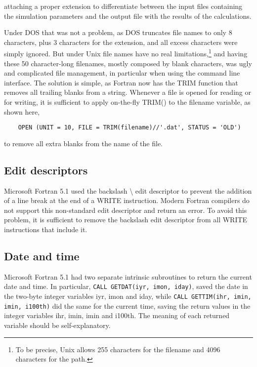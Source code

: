 attaching a proper extension to differentiate between the input files containing the simulation parameters and the output file with the results of the calculations.

Under DOS that was not a problem, as DOS truncates file names to only 8 characters, plus 3 characters for the extension, and all excess characters were simply ignored. But under Unix file names have no real limitations,\footnote{To be precise, Unix allows 255 characters for the filename and 4096 characters for the path.} and having these 50 character-long filenames, mostly composed by blank characters, was ugly and complicated file management, in particular when using the command line interface.
The solution is simple, as Fortran now has the \textsf{TRIM} function that removes all trailing blanks from a string. Whenever a file is opened for reading or for writing, it is sufficient to apply on-the-fly \textsf{TRIM()} to the \textsf{filename} variable, as shown here,

\begin{lstlisting}
	OPEN (UNIT = 10, FILE = TRIM(filename)//'.dat', STATUS = 'OLD')
\end{lstlisting}

to remove all extra blanks from the name of the file.



\subsection{Edit descriptors}

Microsoft Fortran 5.1 used the backslash \textbackslash{} edit descriptor to prevent the addition of a line break at the end of a \textsf{WRITE} instruction.
Modern Fortran compilers do not support this non-standard edit descriptor and return an error. To avoid this problem, it is sufficient to remove the backslash edit descriptor from all \textsf{WRITE} instructions that include it.


\subsection{Date and time}

Microsoft Fortran 5.1 had two separate intrinsic subroutines to return the current date and time.
In particular, \lstinline[columns=fixed]{CALL GETDAT(iyr, imon, iday)}, saved the date in the two-byte integer variables \textsf{iyr}, \textsf{imon} and \textsf{iday}, while \lstinline[columns=fixed]{CALL GETTIM(ihr, imin, imin, i100th)} did the same for the current time, saving the return values in the integer variables \textsf{ihr}, \textsf{imin}, \textsf{imin} and \textsf{i100th}. The meaning of each returned variable should be self-explanatory.

